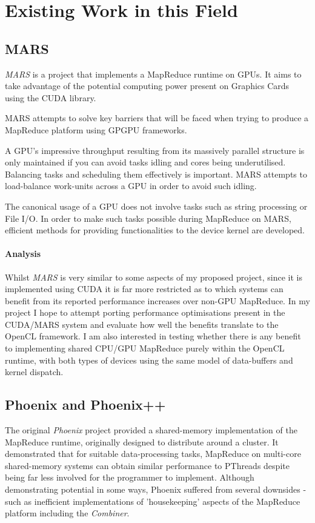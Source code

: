 \section{Existing Work in this Field}
\subsection{MARS}
\emph{MARS}\cite{mars} is a project that implements a MapReduce runtime on \ac{GPUs}. It aims to take advantage of the potential computing power present on Graphics Cards using the \ac{CUDA} library.

MARS attempts to solve key barriers that will be faced when trying to produce a MapReduce platform using \ac{GPGPU} frameworks.

    A GPU's impressive throughput resulting from its massively parallel structure is only maintained if you can avoid tasks idling and cores being underutilised. Balancing tasks and scheduling them effectively is important.
MARS attempts to load-balance work-units across a GPU in order to avoid such idling.

The canonical usage of a GPU does not involve tasks such as string processing or File I/O.
In order to make such tasks possible during MapReduce on MARS, efficient methods for providing functionalities to the device kernel are developed.
\paragraph{Analysis}
Whilst \emph{MARS} is very similar to some aspects of my proposed project, since it is implemented using \ac{CUDA} it is far more restricted as to which systems can benefit from its reported performance increases over non-GPU MapReduce. In my project I hope to attempt porting performance optimisations present in the \ac{CUDA}/MARS system and evaluate how well the benefits translate to the OpenCL framework. I am also interested in testing whether there is any benefit to implementing shared CPU/GPU MapReduce purely within the OpenCL runtime, with both types of devices using the same model of data-buffers and kernel dispatch.
\subsection{Phoenix and Phoenix++}
The original \emph{Phoenix}\cite{phoenix} project provided a shared-memory implementation of the MapReduce runtime, originally designed to distribute around a cluster. It demonstrated that for suitable data-processing tasks, MapReduce on multi-core shared-memory systems can obtain similar performance to PThreads despite being far less involved for the programmer to implement. Although demonstrating potential in some ways, Phoenix suffered from several downsides - such as inefficient implementations of 'housekeeping' aspects of the MapReduce platform including the \emph{Combiner}.

